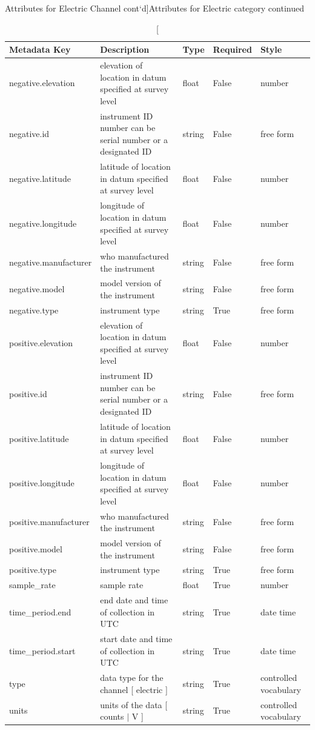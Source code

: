 \documentclass[12pt]{article}
\begin{document}
\newpage
\begin{table}[h!]
    \caption[Attributes for Electric Channel cont`d]{Attributes for Electric category continued}
    \begin{tabular}{|l|p{2.75in}|l|l|p{.95in}|}
    	\hline
    	\textbf{Metadata Key} & \textbf{Description} & \textbf{Type} & \textbf{Required} & \textbf{Style}\\ \hline
   		negative.elevation & elevation of location in datum specified at survey level & float & False & number \\ \hline
    	negative.id & instrument ID number can be serial number or a designated ID & string & False & free form \\ \hline
    	negative.latitude & latitude of location in datum specified at survey level & float & False & number \\ \hline
    	negative.longitude & longitude of location in datum specified at survey level & float & False & number \\ \hline
    	negative.manufacturer & who manufactured the instrument & string & False & free form \\ \hline
    	negative.model & model version of the instrument & string & False & free form \\ \hline
    	negative.type & instrument type & string & True & free form \\ \hline
       	positive.elevation & elevation of location in datum specified at survey level & float & False & number \\ \hline
        positive.id & instrument ID number can be serial number or a designated ID & string & False & free form \\ \hline
        positive.latitude & latitude of location in datum specified at survey level & float & False & number \\ \hline
        positive.longitude & longitude of location in datum specified at survey level & float & False & number \\ \hline
        positive.manufacturer & who manufactured the instrument & string & False & free form \\ \hline
        positive.model & model version of the instrument & string & False & free form \\ \hline
        positive.type & instrument type & string & True & free form \\ \hline
        sample\_rate & sample rate & float & True & number \\ \hline
        time\_period.end & end date and time of collection in UTC & string & True & date time \\ \hline
        time\_period.start & start date and time of collection in UTC & string & True & date time \\ \hline
        type & data type for the channel [ electric ]& string & True & controlled vocabulary \\ \hline
        units & units of the data [ counts $|$ V ] & string & True & controlled vocabulary \\ \hline
        \end{tabular}
        \label{tab:electric02}
\end{table}    
\end{document}
